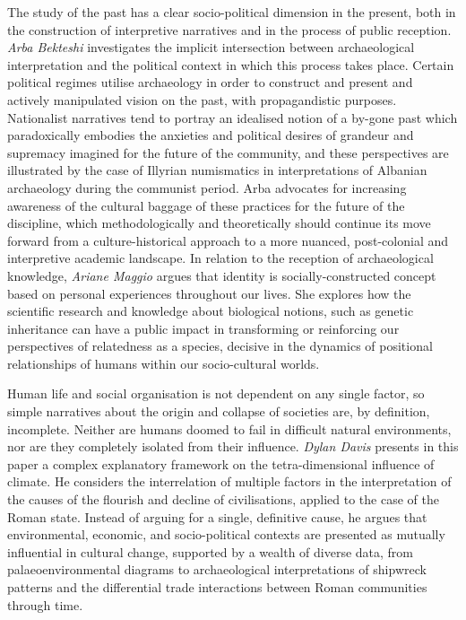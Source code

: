 The study of the past has a clear socio-political dimension in the present, both in the construction of interpretive narratives and in the process of public reception. \emph{Arba Bekteshi} investigates the implicit intersection between archaeological interpretation and the political context in which this process takes place. Certain political regimes utilise archaeology in order to construct and present and actively manipulated vision on the past, with propagandistic purposes. Nationalist narratives tend to portray an idealised notion of a by-gone past which paradoxically embodies the anxieties and political desires of grandeur and supremacy imagined for the future of the community, and these perspectives are illustrated by the case of Illyrian numismatics in interpretations of Albanian archaeology during the communist period. Arba advocates for increasing awareness of the cultural baggage of these practices for the future of the discipline, which methodologically and theoretically should continue its move forward from a culture-historical approach to a more nuanced, post-colonial and interpretive academic landscape. In relation to the reception of archaeological knowledge, \emph{Ariane Maggio} argues that identity is socially-constructed concept based on personal experiences throughout our lives. She explores how the scientific research and knowledge about biological notions, such as genetic inheritance can have a public impact in transforming or reinforcing our perspectives of relatedness as a species, decisive in the dynamics of positional relationships of humans within our socio-cultural worlds.
		
Human life and social organisation is not dependent on any single factor, so simple narratives about the origin and collapse of societies are, by definition, incomplete. Neither are humans doomed to fail in difficult natural environments, nor are they completely isolated from their influence. \emph{Dylan Davis} presents in this paper a complex explanatory framework on the tetra-dimensional influence of climate. He considers the interrelation of multiple factors in the interpretation of the causes of the flourish and decline of civilisations, applied to the case of the Roman state. Instead of arguing for a single, definitive cause, he argues that environmental, economic, and socio-political contexts are presented as mutually influential in cultural change, supported by a wealth of diverse data, from palaeoenvironmental diagrams to archaeological interpretations of shipwreck patterns and the differential trade interactions between Roman communities through time.
		 
